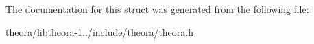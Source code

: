 The documentation for this struct was generated from the following file\+:\begin{DoxyCompactItemize}
\item 
theora/libtheora-\/1../include/theora/\hyperlink{theora_8h}{theora.\+h}\end{DoxyCompactItemize}
